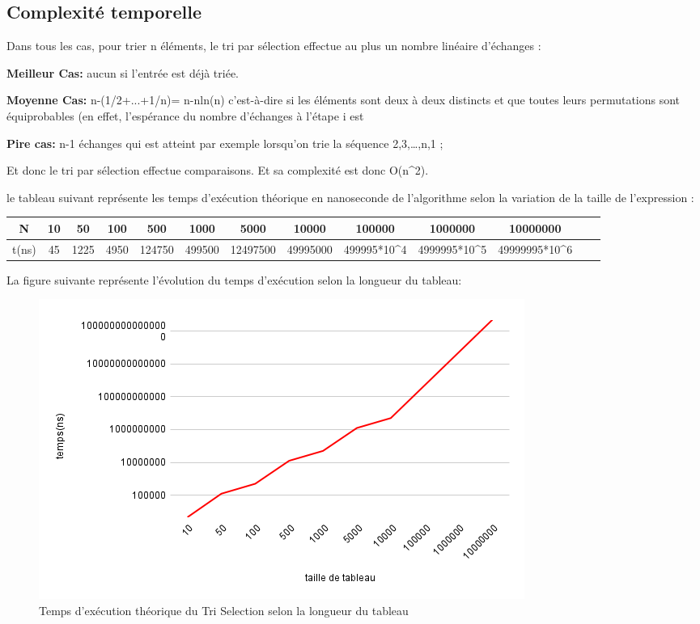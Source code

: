 \subsection{Complexité temporelle}
Dans tous les cas, pour trier n éléments, le tri par sélection effectue au plus un nombre linéaire d'échanges :
\par
\textbf{Meilleur Cas:} 
aucun si l'entrée est déjà triée. 
\par
\textbf{Moyenne Cas:}
n-(1/2+...+1/n)= n-nln(n) c'est-à-dire si les éléments sont deux à deux distincts et que toutes leurs permutations sont équiprobables (en effet, l'espérance du nombre d'échanges à l'étape i est 
\par
\textbf{Pire cas:}
n-1 échanges qui est atteint par exemple lorsqu'on trie la séquence 2,3,…,n,1 ;
\par
Et donc le tri par sélection effectue  comparaisons. Et sa complexité est donc O(n^2).
\par
le tableau suivant représente les temps d’exécution théorique en nanoseconde de l’algorithme selon la variation de la taille de l’expression :
\small
\begin{center}
\begin{tabular}{| c | c | c | c | c | c | c | c | c | c | c | c | c |}
    \hline
    N &  10 & 50 & 100 & 500 & 1000 & 5000 & 10000 & 100000 & 1000000 & 10000000 \\
    \hline
    t(ns) & 45 &
1225&
4950&
124750&
499500&
12497500&
49995000&
499995*10^4&
4999995*10^5&
49999995*10^6 \\
    \hline
\end{tabular}  
\end{center}
\par
La figure suivante représente l’évolution du temps d’exécution selon la longueur du tableau: 
\begin{figure}[H]
    \centering
        \includegraphics[scale=0.7]{ressources/chartselecttheorique.png}
        \caption{Temps d'exécution théorique du Tri Selection selon la longueur du tableau}
    \label{fig:temps_exec_selec_theo}
\end{figure} 
